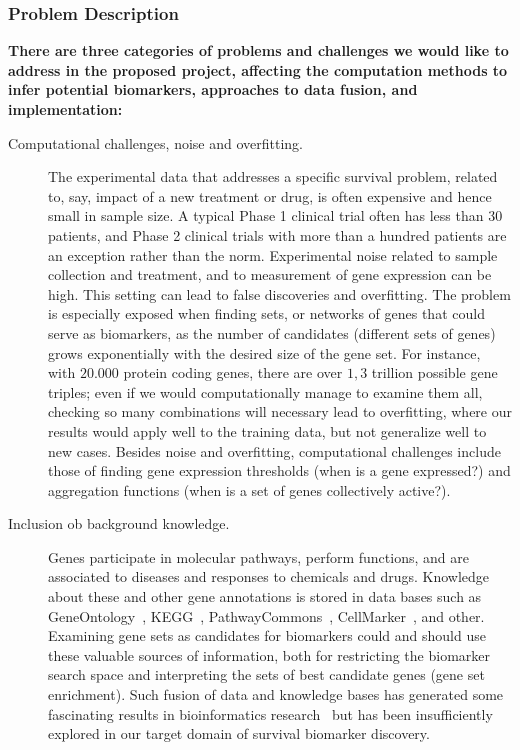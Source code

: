 \documentclass[11pt,a4paper]{article}
\renewcommand{\bold}{\textbf}
\begin{document}
\subsubsection*{Problem Description}

\bold{ There are three categories of problems and challenges we would like to address in the proposed project, affecting the computation methods to infer potential biomarkers, approaches to data fusion, and implementation:}
\begin{description}
	\item[Computational challenges, noise and overfitting.] The experimental data that addresses a specific survival problem, related to, say, impact of a new treatment or drug, is often expensive and hence small in sample size. A typical Phase 1 clinical trial often has less than 30 patients, and Phase 2 clinical trials with more than a hundred patients are an exception rather than the norm. Experimental noise related to sample collection and treatment, and to measurement of gene expression can be high. This setting can lead to false discoveries and overfitting. The problem is especially exposed when finding sets, or networks of genes that could serve as biomarkers, as the number of candidates (different sets of genes) grows exponentially with the desired size of the gene set. For instance, with $20.000$ protein coding genes, there are over $1,3$ trillion possible gene triples; even if we would computationally manage to examine them all, checking so many combinations will necessary lead to overfitting, where our results would apply well to the training data, but not generalize well to new cases. Besides noise and overfitting, computational challenges include those of finding gene expression thresholds (when is a gene expressed?) and aggregation functions (when is a set of genes collectively active?).
	\item[Inclusion ob background knowledge.] Genes participate in molecular pathways, perform functions, and are associated to diseases and responses to chemicals and drugs. Knowledge about these and other gene annotations is stored in data bases such as GeneOntology~\cite{}, KEGG~\cite{}, PathwayCommons~\cite{}, CellMarker~\cite{}, and other. Examining gene sets as candidates for biomarkers could and should use these valuable sources of information, both for restricting the biomarker search space and interpreting the sets of best candidate genes (gene set enrichment). Such fusion of data and knowledge bases has generated some fascinating results in bioinformatics research~\cite{} but has been insufficiently explored in our target domain of survival biomarker discovery.

\end{description}
\end{document}
